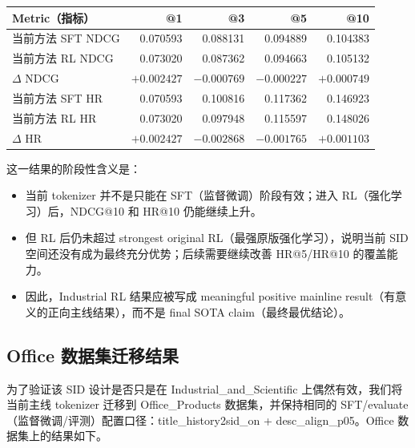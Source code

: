 \documentclass[11pt]{article}
\begin{document}
\begin{center}
\begin{tabular}{lrrrr}
\toprule
Metric（指标） & @1 & @3 & @5 & @10 \\
\midrule
当前方法 SFT NDCG & 0.070593 & 0.088131 & 0.094889 & 0.104383 \\
当前方法 RL NDCG & 0.073020 & 0.087362 & 0.094663 & 0.105132 \\
$\Delta$ NDCG & $+0.002427$ & $-0.000769$ & $-0.000227$ & $+0.000749$ \\
\midrule
当前方法 SFT HR & 0.070593 & 0.100816 & 0.117362 & 0.146923 \\
当前方法 RL HR & 0.073020 & 0.097948 & 0.115597 & 0.148026 \\
$\Delta$ HR & $+0.002427$ & $-0.002868$ & $-0.001765$ & $+0.001103$ \\
\bottomrule
\end{tabular}
\end{center}

这一结果的阶段性含义是：

\begin{itemize}
  \item 当前 tokenizer 并不是只能在 SFT（监督微调）阶段有效；进入 RL（强化学习）后，NDCG@10 和 HR@10 仍能继续上升。
  \item 但 RL 后仍未超过 strongest original RL（最强原版强化学习），说明当前 SID 空间还没有成为最终充分优势；后续需要继续改善 HR@5/HR@10 的覆盖能力。
  \item 因此，Industrial RL 结果应被写成 meaningful positive mainline result（有意义的正向主线结果），而不是 final SOTA claim（最终最优结论）。
\end{itemize}

\subsection{Office 数据集迁移结果}

为了验证该 SID 设计是否只是在 Industrial\_and\_Scientific 上偶然有效，我们将当前主线 tokenizer 迁移到 Office\_Products 数据集，并保持相同的 SFT/evaluate（监督微调/评测）配置口径：title\_history2sid\_on + desc\_align\_p05。Office 数据集上的结果如下。
\end{document}

